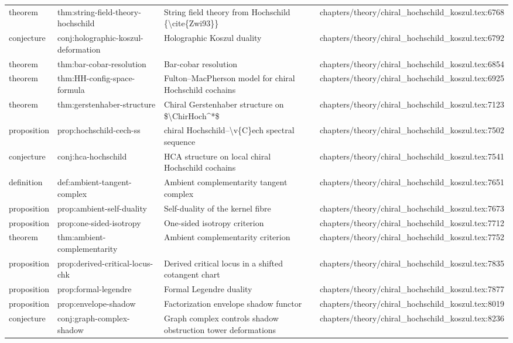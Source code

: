 \documentclass[11pt]{article}
\begin{document}
\begin{longtable}{L{0.10\textwidth}L{0.26\textwidth}L{0.42\textwidth}L{0.22\textwidth}}
theorem & thm:string-field-theory-hochschild & String field theory from Hochschild \{\textbackslash{}cite\{Zwi93\}\} & chapters/theory/chiral\_hochschild\_koszul.tex:6768\\
conjecture & conj:holographic-koszul-deformation & Holographic Koszul duality & chapters/theory/chiral\_hochschild\_koszul.tex:6792\\
theorem & thm:bar-cobar-resolution & Bar-cobar resolution & chapters/theory/chiral\_hochschild\_koszul.tex:6854\\
theorem & thm:HH-config-space-formula & Fulton--MacPherson model for chiral Hochschild cochains & chapters/theory/chiral\_hochschild\_koszul.tex:6925\\
theorem & thm:gerstenhaber-structure & Chiral Gerstenhaber structure on \$\textbackslash{}ChirHoch\textasciicircum{}*\$ & chapters/theory/chiral\_hochschild\_koszul.tex:7123\\
proposition & prop:hochschild-cech-ss & chiral Hochschild--\textbackslash{}v\{C\}ech spectral sequence & chapters/theory/chiral\_hochschild\_koszul.tex:7502\\
conjecture & conj:hca-hochschild & HCA structure on local chiral Hochschild cochains & chapters/theory/chiral\_hochschild\_koszul.tex:7541\\
definition & def:ambient-tangent-complex & Ambient complementarity tangent complex & chapters/theory/chiral\_hochschild\_koszul.tex:7651\\
proposition & prop:ambient-self-duality & Self-duality of the kernel fibre & chapters/theory/chiral\_hochschild\_koszul.tex:7673\\
proposition & prop:one-sided-isotropy & One-sided isotropy criterion & chapters/theory/chiral\_hochschild\_koszul.tex:7712\\
theorem & thm:ambient-complementarity & Ambient complementarity criterion & chapters/theory/chiral\_hochschild\_koszul.tex:7752\\
proposition & prop:derived-critical-locus-chk & Derived critical locus in a shifted cotangent chart & chapters/theory/chiral\_hochschild\_koszul.tex:7835\\
proposition & prop:formal-legendre & Formal Legendre duality & chapters/theory/chiral\_hochschild\_koszul.tex:7877\\
proposition & prop:envelope-shadow & Factorization envelope shadow functor & chapters/theory/chiral\_hochschild\_koszul.tex:8019\\
conjecture & conj:graph-complex-shadow & Graph complex controls shadow obstruction tower deformations & chapters/theory/chiral\_hochschild\_koszul.tex:8236\\

\end{longtable}
\end{document}
